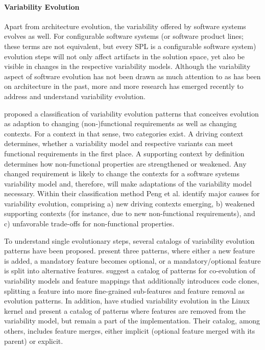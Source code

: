 \paragraph*{Variability Evolution}
Apart from architecture evolution, the variability offered by software systems
evolves as well. For configurable software systems (or software product lines; 
these terms are not equivalent, but every SPL is a configurable software system)
evolution steps will not only affect artifacts in the solution space, yet also be visible in changes in the respective variability models.
Although the variability aspect of software evolution has not been drawn as
much attention to as has been on architecture in the past, more and more
research has emerged recently to address and understand variability evolution.

\cite{peng_analyzing_2011} proposed a classification of variability evolution patterns that
conceives evolution as adaption to changing (non-)functional requirements as
well as changing contexts. For a context in that sense, two
categories exist. A driving context determines, whether a variability model and respective variants
can meet functional requirements in the first place. A supporting context by
definition determines how non-functional properties are strengthened or
weakened. Any changed requirement is likely to change the contexts for a
software systems variability model and, therefore, will make adaptations of the
variability model necessary. Within their classification method Peng et al.
identify  major causes for variability evolution, comprising a) new driving
contexts emerging, b) weakened supporting contexts (for instance, due to new
non-functional requirements), and c) unfavorable trade-offs for non-functional
properties. 

To understand single evolutionary steps, several catalogs of variability
evolution patterns have been proposed. \cite{peng_analyzing_2011} present three patterns,
where either a new feature is added, a mandatory feature becomes optional, or a
mandatory/optional feature is split into alternative features. \cite{seidl_co-evolution_2012} suggest a catalog of
patterns for co-evolution of variability models and feature mappings that additionally introduces code clones, splitting a feature
into more fine-grained sub-features and feature removal as evolution patterns.
In addition, \cite{passos_towards_2012} have studied variability evolution in
the Linux kernel and present a catalog of patterns where features are removed from the
variability model, but remain a part of the implementation. Their
catalog, among others, includes feature merges, either implicit (optional feature merged
with its parent) or explicit.

